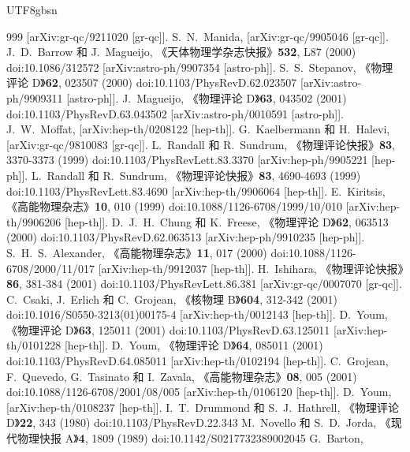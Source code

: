 \documentclass[jkps,preprint,fleqn]{revtex4}
\begin{document}
\begin{CJK*}{UTF8}{gbsn}
\begin{thebibliography}{999}
[arXiv:gr-qc/9211020 [gr-qc]].
S.~N.~Manida,
[arXiv:gr-qc/9905046 [gr-qc]].
J.~D.~Barrow 和 J.~Magueijo,
《天体物理学杂志快报》\textbf{532}, L87 (2000)
doi:10.1086/312572
[arXiv:astro-ph/9907354 [astro-ph]].
S.~S.~Stepanov,
《物理评论 D》\textbf{62}, 023507 (2000)
doi:10.1103/PhysRevD.62.023507
[arXiv:astro-ph/9909311 [astro-ph]].
J.~Magueijo,
《物理评论 D》\textbf{63}, 043502 (2001)
doi:10.1103/PhysRevD.63.043502
[arXiv:astro-ph/0010591 [astro-ph]].
J.~W.~Moffat,
[arXiv:hep-th/0208122 [hep-th]].
G.~Kaelbermann 和 H.~Halevi,
[arXiv:gr-qc/9810083 [gr-qc]].
L.~Randall 和 R.~Sundrum,
《物理评论快报》\textbf{83}, 3370-3373 (1999)
doi:10.1103/PhysRevLett.83.3370
[arXiv:hep-ph/9905221 [hep-ph]].
L.~Randall 和 R.~Sundrum,
《物理评论快报》\textbf{83}, 4690-4693 (1999)
doi:10.1103/PhysRevLett.83.4690
[arXiv:hep-th/9906064 [hep-th]].
E.~Kiritsis,
《高能物理杂志》\textbf{10}, 010 (1999)
doi:10.1088/1126-6708/1999/10/010
[arXiv:hep-th/9906206 [hep-th]].
D.~J.~H.~Chung 和 K.~Freese,
《物理评论 D》\textbf{62}, 063513 (2000)
doi:10.1103/PhysRevD.62.063513
[arXiv:hep-ph/9910235 [hep-ph]].
S.~H.~S.~Alexander,
《高能物理杂志》\textbf{11}, 017 (2000)
doi:10.1088/1126-6708/2000/11/017
[arXiv:hep-th/9912037 [hep-th]].
H.~Ishihara,
《物理评论快报》\textbf{86}, 381-384 (2001)
doi:10.1103/PhysRevLett.86.381
[arXiv:gr-qc/0007070 [gr-qc]].
C.~Csaki, J.~Erlich 和 C.~Grojean,
《核物理 B》\textbf{604}, 312-342 (2001)
doi:10.1016/S0550-3213(01)00175-4
[arXiv:hep-th/0012143 [hep-th]].
D.~Youm,
《物理评论 D》\textbf{63}, 125011 (2001)
doi:10.1103/PhysRevD.63.125011
[arXiv:hep-th/0101228 [hep-th]].
D.~Youm,
《物理评论 D》\textbf{64}, 085011 (2001)
doi:10.1103/PhysRevD.64.085011
[arXiv:hep-th/0102194 [hep-th]].
C.~Grojean, F.~Quevedo, G.~Tasinato 和 I.~Zavala,
《高能物理杂志》\textbf{08}, 005 (2001)
doi:10.1088/1126-6708/2001/08/005
[arXiv:hep-th/0106120 [hep-th]].
D.~Youm,
[arXiv:hep-th/0108237 [hep-th]].
I.~T.~Drummond 和 S.~J.~Hathrell,
《物理评论 D》\textbf{22}, 343 (1980)
doi:10.1103/PhysRevD.22.343
M.~Novello 和 S.~D.~Jorda,
《现代物理快报 A》\textbf{4}, 1809 (1989)
doi:10.1142/S0217732389002045
G.~Barton,

\end{thebibliography}
\end{CJK*}
\end{document}
